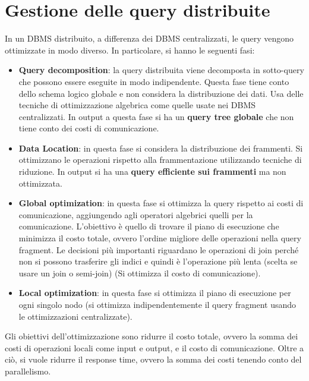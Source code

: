 \section{Gestione delle query distribuite}
In un DBMS distribuito, a differenza dei DBMS centralizzati, le query vengono ottimizzate
in modo diverso. In particolare, si hanno le seguenti fasi:
\begin{itemize}
      \item \textbf{Query decomposition}: la query distribuita viene decomposta in
            sotto-query che possono essere eseguite in modo indipendente. Questa
            fase tiene conto dello schema logico globale e non considera la
            distribuzione dei dati. Usa delle tecniche di ottimizzazione algebrica
            come quelle usate nei DBMS centralizzati.
            In output a questa fase si ha un \textbf{query tree globale} che non tiene
            conto dei costi di comunicazione.
      \item \textbf{Data Location}: in questa fase si considera la distribuzione
            dei frammenti. Si ottimizzano le operazioni rispetto alla
            frammentazione utilizzando tecniche di riduzione. In output si ha una
            \textbf{query efficiente sui frammenti} ma non ottimizzata.
      \item \textbf{Global optimization}: in questa fase si ottimizza la query
            rispetto ai costi di comunicazione, aggiungendo agli operatori
            algebrici quelli per la comunicazione. L'obiettivo è quello di
            trovare il piano di esecuzione che minimizza il costo totale, ovvero
            l'ordine migliore delle operazioni nella query fragment. Le
            decisioni più importanti riguardano le operazioni di join perché
            non si possono trasferire gli indici e quindi è l'operazione più lenta
            (scelta se usare un join o semi-join) (Si ottimizza il costo di comunicazione).
      \item \textbf{Local optimization}: in questa fase si ottimizza il piano di
            esecuzione per ogni singolo nodo (si ottimizza indipendentemente il
            query fragment usando le ottimizzazioni centralizzate).
\end{itemize}
Gli obiettivi dell'ottimizzazione sono ridurre il costo totale, ovvero la somma
dei costi di operazioni locali come input e output, e il costo di comunicazione.
Oltre a ciò, si vuole ridurre il response time, ovvero la somma dei costi tenendo
conto del parallelismo.
